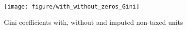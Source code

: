 \documentclass[twoside]{article}\usepackage[]{graphicx}\usepackage[]{color}
\newenvironment{knitrout}{}{} %
\begin{document}
\begin{multicols}{2}

\begin{knitrout}
\color{fgcolor}\begin{figure}[H]

\texttt{[image: figure/with\_without\_zeros\_Gini]} \caption[Gini coefficients with, without and imputed non-taxed units]{Gini coefficients with, without and imputed non-taxed units\label{fig:with_without_zeros_Gini}}
\end{figure}


\end{knitrout}







\end{multicols}
\end{document}
